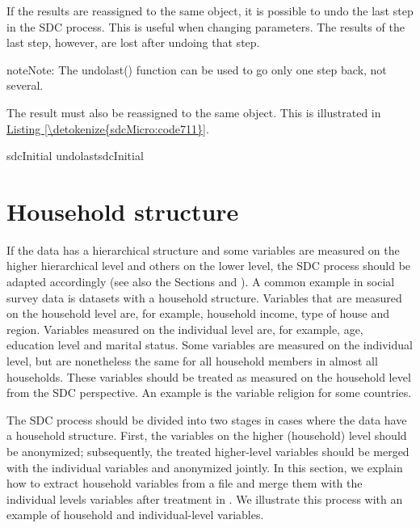 \documentclass[letterpaper,10pt,english]{sphinxmanual}
\begin{document}
If the results are reassigned to the same  object, it is
possible to undo the last step in the SDC process. This is useful when
changing parameters. The results of the last step, however, are lost
after undoing that step.

\begin{sphinxadmonition}{note}{Note:}
The undolast() function can be used to
go only one step back, not several.
\end{sphinxadmonition}

The result must also be reassigned
to the same object. This is illustrated in \hyperref[\detokenize{sdcMicro:code711}]{Listing \ref{\detokenize{sdcMicro:code711}}}.

\def\sphinxLiteralBlockLabel{\label{\detokenize{sdcMicro:code711}}}
%
\begin{sphinxVerbatim}[commandchars=\\\{\},numbers=left,firstnumber=1,stepnumber=1]
sdcInitial  undolastsdcInitial
\end{sphinxVerbatim}


\section{Household structure}
\label{\detokenize{sdcMicro:household-structure}}
If the data has a hierarchical structure and some variables are measured
on the higher hierarchical level and others on the lower level, the SDC
process should be adapted accordingly (see also the Sections
 and
). A
common example in social survey data is datasets with a household
structure. Variables that are measured on the household level are, for
example, household income, type of house and region. Variables measured
on the individual level are, for example, age, education level and
marital status. Some variables are measured on the individual level, but
are nonetheless the same for all household members in almost all
households. These variables should be treated as measured on the
household level from the SDC perspective. An example is the variable
religion for some countries.

The SDC process should be divided into two stages in cases where the
data have a household structure. First, the variables on the higher
(household) level should be anonymized; subsequently, the treated
higher-level variables should be merged with the individual variables
and anonymized jointly. In this section, we explain how to extract
household variables from a file and merge them with the individual
levels variables after treatment in . We illustrate this process with
an example of household and individual-level variables.
\end{document}
